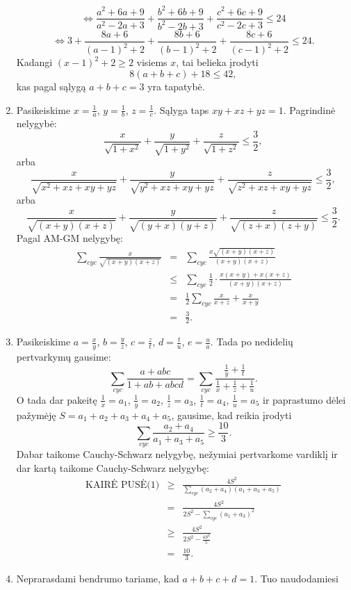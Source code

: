 \begin{enumerate}
$$\Leftrightarrow\frac{a^2+6a+9}{a^2-2a+3}+\frac{b^2+6b+9}{b^2-2b+3}+\frac{c^2+6c+9}{c^2-2c+3}\leq24$$
$$\Leftrightarrow3+\frac{8a+6}{(a-1)^2+2}+\frac{8b+6}{(b-1)^2+2}+\frac{8c+6}{(c-1)^2+2}\leq24.
$$ Kadangi $(x-1)^2+2\geq2$ visiems $x$, tai belieka įrodyti
$$8(a+b+c)+18\leq42,$$ kas pagal sąlygą $a+b+c=3$ yra tapatybė.
\item 
Pasikeiskime $x=\frac{1}{a}$, $y=\frac{1}{b}$, $z=\frac{1}{c}$. Sąlyga
taps $xy+xz+yz=1$. Pagrindinė nelygybė:
$$\frac{x}{\sqrt{1+x^2}}+\frac{y}{\sqrt{1+y^2}}+\frac{z}{\sqrt{1+z^2}}\leq\frac{3}{2},$$
arba
$$\frac{x}{\sqrt{x^2+xz+xy+yz}}+\frac{y}{\sqrt{y^2+xz+xy+yz}}+\frac{z}{\sqrt{z^2+xz+xy+yz}}\leq\frac{3}{2},$$
arba
$$\frac{x}{\sqrt{(x+y)(x+z)}}+\frac{y}{\sqrt{(y+x)(y+z)}}+\frac{z}{\sqrt{(z+x)(z+y)}}\leq\frac{3}{2}.$$
Pagal AM-GM nelygybę:
\begin{eqnarray*}\sum_{cyc}{\frac{x}{\sqrt{(x+y)(x+z)}}}
&=&\sum_{cyc}{\frac{x\sqrt{(x+y)(x+z)}}{(x+y)(x+z)}} \\
&\leq&\sum_{cyc}{\frac{1}{2}\cdot\frac{x(x+y)+x(x+z)}{(x+y)(x+z)}}\\
&=&\frac{1}{2}\sum_{cyc}{\frac{x}{x+z}+\frac{x}{x+y}}\\&=&\frac{3}{2}.\end{eqnarray*}
\item 
Pasikeiskime $a=\frac{x}{y}$, $b=\frac{y}{z}$, $c=\frac{z}{t}$,
$d=\frac{t}{u}$, $e=\frac{u}{a}$. Tada po nedidelių pertvarkymų
gausime:
$$\sum_{cyc}{\frac{a+abc}{1+ab+abcd}}=\sum_{cyc}{\frac{\frac{1}{y}+\frac{1}{t}}{\frac{1}{x}+\frac{1}{z}+\frac{1}{u}}}.$$
O tada dar pakeitę $\frac{1}{x}=a_1$, $\frac{1}{y}=a_2$,
$\frac{1}{z}=a_3$, $\frac{1}{t}=a_4$, $\frac{1}{u}=a_5$ ir paprastumo
dėlei pažymėję $S=a_1+a_2+a_3+a_4+a_5$, gausime, kad reikia įrodyti
\begin{equation*}\sum_{cyc}{\frac{a_2+a_4}{a_1+a_3+a_5}}\geq\frac{10}{3}.\tag{1}\end{equation*}
Dabar taikome Cauchy-Schwarz nelygybę, nežymiai pertvarkome vardiklį
ir dar kartą taikome Cauchy-Schwarz nelygybę:
\begin{eqnarray*}\text{KAIRĖ
PUSĖ(1)}&\geq&\frac{4S^2}{\sum\limits_{cyc}{(a_2+a_4)(a_1+a_3+a_5)}}\\
&=&\frac{4S^2}{2S^2-\sum\limits_{cyc}{(a_1+a_3)^2}}\\
&\geq&\frac{4S^2}{2S^2-\frac{4S^2}{5}}\\
&=&\frac{10}{3}.\end{eqnarray*}
\item 
Neprarasdami bendrumo tariame, kad $a+b+c+d=1$. Tuo naudodamiesi

\end{enumerate}

